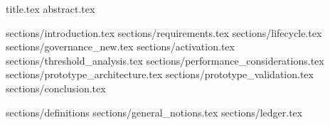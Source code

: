 \documentclass{llncs}
\begin{document}
{title.tex}
{abstract.tex}

\clearpage

\tableofcontents
\listoffigures
\listoftables

\clearpage
{sections/introduction.tex}
{sections/requirements.tex}
{sections/lifecycle.tex}
{sections/governance_new.tex}
{sections/activation.tex}
{sections/threshold_analysis.tex}
{sections/performance_considerations.tex}
{sections/prototype_architecture.tex}
{sections/prototype_validation.tex}
{sections/conclusion.tex}
\clearpage


\appendix
{sections/definitions}
{sections/general_notions.tex}
{sections/ledger.tex}
\end{document}
